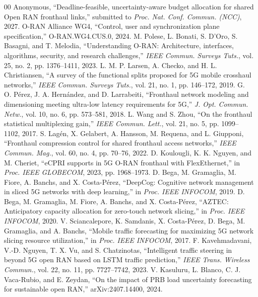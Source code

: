 \documentclass[journal]{IEEEtran}
\begin{document}
\begin{thebibliography}{00}
 Anonymous, ``Deadline-feasible, uncertainty-aware budget allocation for shared Open RAN fronthaul links,'' submitted to \emph{Proc. Nat. Conf. Commun. (NCC)}, 2027.
 O-RAN Alliance WG4, ``Control, user and synchronization plane specification,'' O-RAN.WG4.CUS.0, 2024.
 M. Polese, L. Bonati, S. D'Oro, S. Basagni, and T. Melodia, ``Understanding O-RAN: Architecture, interfaces, algorithms, security, and research challenges,'' \emph{IEEE Commun. Surveys Tuts.}, vol. 25, no. 2, pp. 1376--1411, 2023.
 L. M. P. Larsen, A. Checko, and H. L. Christiansen, ``A survey of the functional splits proposed for 5G mobile crosshaul networks,'' \emph{IEEE Commun. Surveys Tuts.}, vol. 21, no. 1, pp. 146--172, 2019.
 G. O. P\'erez, J. A. Hern\'andez, and D. Larrabeiti, ``Fronthaul network modeling and dimensioning meeting ultra-low latency requirements for 5G,'' \emph{J. Opt. Commun. Netw.}, vol. 10, no. 6, pp. 573--581, 2018.
 L. Wang and S. Zhou, ``On the fronthaul statistical multiplexing gain,'' \emph{IEEE Commun. Lett.}, vol. 21, no. 5, pp. 1099--1102, 2017.
 S. Lag\'en, X. Gelabert, A. Hansson, M. Requena, and L. Giupponi, ``Fronthaul compression control for shared fronthaul access networks,'' \emph{IEEE Commun. Mag.}, vol. 60, no. 4, pp. 70--76, 2022.
 D. Koulougli, K. K. Nguyen, and M. Cheriet, ``eCPRI supports in 5G O-RAN fronthaul with FlexEthernet,'' in \emph{Proc. IEEE GLOBECOM}, 2023, pp. 1968--1973.
 D. Bega, M. Gramaglia, M. Fiore, A. Banchs, and X. Costa-P\'erez, ``DeepCog: Cognitive network management in sliced 5G networks with deep learning,'' in \emph{Proc. IEEE INFOCOM}, 2019.
 D. Bega, M. Gramaglia, M. Fiore, A. Banchs, and X. Costa-P\'erez, ``AZTEC: Anticipatory capacity allocation for zero-touch network slicing,'' in \emph{Proc. IEEE INFOCOM}, 2020.
 V. Sciancalepore, K. Samdanis, X. Costa-P\'erez, D. Bega, M. Gramaglia, and A. Banchs, ``Mobile traffic forecasting for maximizing 5G network slicing resource utilization,'' in \emph{Proc. IEEE INFOCOM}, 2017.
 F. Kavehmadavani, V.-D. Nguyen, T. X. Vu, and S. Chatzinotas, ``Intelligent traffic steering in beyond 5G open RAN based on LSTM traffic prediction,'' \emph{IEEE Trans. Wireless Commun.}, vol. 22, no. 11, pp. 7727--7742, 2023.
 V. Kasuluru, L. Blanco, C. J. Vaca-Rubio, and E. Zeydan, ``On the impact of PRB load uncertainty forecasting for sustainable open RAN,'' arXiv:2407.14400, 2024.

\end{thebibliography}
\end{document}
